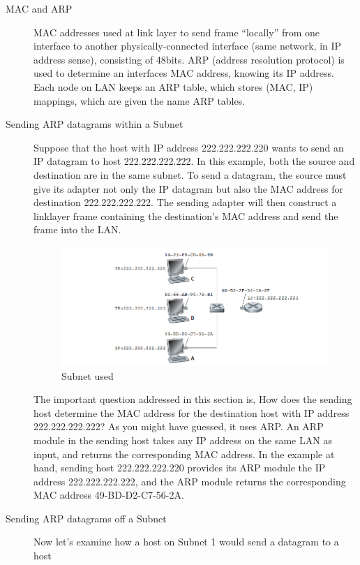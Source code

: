 \documentclass{article}
\begin{document}
\begin{description}
    \item[MAC and ARP] MAC addresses used at link layer to send frame ``locally'' from one interface
    to another physically-connected interface (same network, in IP address  sense), consisting of
    48bits. ARP (address resolution protocol) is used to determine an interfaces MAC address, knowing
    its IP address. Each node on LAN keeps an ARP table, which stores (MAC, IP) mappings, which are given the name ARP tables.
    \item[Sending ARP datagrams within a Subnet] 
    Suppose that the host with IP address 222.222.222.220 wants to send an IP
    datagram to host 222.222.222.222. In this example, both the source and destination
    are in the same subnet. To send a datagram,
    the source must give its adapter not only the IP datagram but also the MAC address
    for destination 222.222.222.222. The sending adapter will then construct a linklayer
    frame containing the destination’s MAC address and send the frame into
    the LAN.
    \begin{figure}[H]
        \centering
        \includegraphics[scale=0.8]{images/arp_1.png}
        \caption{Subnet used}
    \end{figure}
    The important question addressed in this section is, How does the sending
    host determine the MAC address for the destination host with IP address
    222.222.222.222? As you might have guessed, it uses ARP. An ARP module in the
    sending host takes any IP address on the same LAN as input, and returns the corresponding
    MAC address. In the example at hand, sending host 222.222.222.220
    provides its ARP module the IP address 222.222.222.222, and the ARP module
    returns the corresponding MAC address 49-BD-D2-C7-56-2A.
    \item[Sending ARP datagrams off a Subnet]
    Now let’s examine how a host on Subnet 1 would send a datagram to a host

\end{description}
\end{document}

